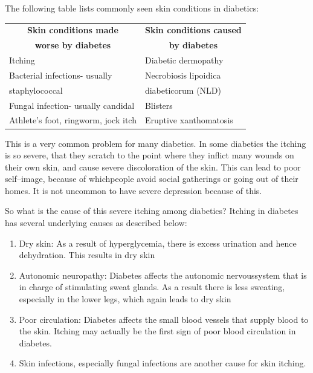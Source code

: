 \vskip 4pt
\noindent The following table lists commonly seen skin conditions in diabetics:

\begin{center}
\begin{tabular}{|l|l|}
\hline
\multicolumn{1}{|c}{\textbf{Skin conditions made}} & \multicolumn{1}{|c|}{\textbf{Skin conditions caused}}\\
\multicolumn{1}{|c}{\textbf{worse by diabetes}} & \multicolumn{1}{|c|}{\textbf{by diabetes}}\\
\hline
Itching & Diabetic dermopathy\\
\hline
Bacterial infections- usually & Necrobiosis lipoidica\\
\hline
staphylococcal & diabeticorum (NLD)\\
\hline
Fungal infection- usually candidal & Blisters\\
\hline
Athlete’s foot, ringworm, jock itch & Eruptive xanthomatosis\\
\hline
\end{tabular}
\end{center}


This is a very common problem for many diabetics. In some dia\-betics the itching is so severe, that they scratch to the point where they inflict many wounds on their own skin, and cause severe dis\-coloration of the skin. This can lead to poor self–image, because of which\break people avoid social gatherings or going out of their homes. It is not un\-common to have severe depression because of this.

So what is the cause of this severe itching among diabetics? Itching in diabetes has several underlying causes as described below:
\begin{enumerate}[•]
\itemsep=0pt
\item Dry skin: As a result of hyperglycemia, there is excess urination and hence dehydration. This results in dry skin
\item Autonomic neuropathy: Diabetes affects the autonomic nervous\break system that is in charge of stimulating sweat glands. As a result there is less sweating, especially in the lower legs, which again leads to dry skin
\item Poor circulation: Diabetes affects the small blood vessels that supply blood to the skin. Itching may actually be the first sign of poor blood circulation in diabetes.
\item Skin infections, especially fungal infections are another cause for skin itching.
\end{enumerate}

